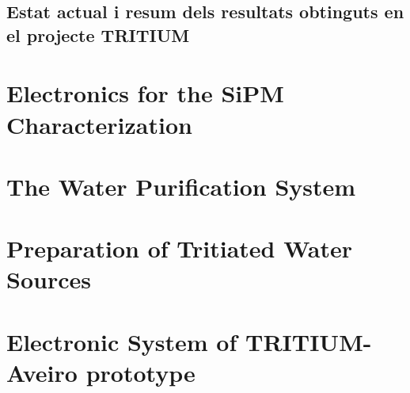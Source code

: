\documentclass[12pt,a4paper]{book}
\begin{document}
\section{Estat actual i resum dels resultats obtinguts en el projecte TRITIUM}\label{sec:EstatActual}
		 
		\newpage


\appendix
\appendixpage
\noappendicestocpagenum
\addappheadtotoc

\chapter{Electronics for the SiPM Characterization}\label{App:ElectronicReadoutSiPM}


\chapter{The Water Purification System}\label{App:UltraPureWaterSystem}


\chapter{Preparation of Tritiated Water Sources}\label{App:TritiumSourcePreparation}


\chapter{Electronic System of TRITIUM-Aveiro prototype}\label{App:ElectronicSystemAveiro}


%

%




\end{document}
